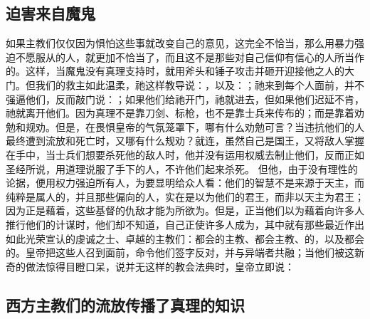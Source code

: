 
\subsection{迫害来自魔鬼}

如果主教们仅仅因为惧怕这些事就改变自己的意见，这完全不恰当，那么用暴力强迫不愿服从的人，就更加不恰当了，而且这不是那些对自己信仰有信心的人所当作的。这样，当魔鬼没有真理支持时，就用斧头和锤子攻击并砸开迎接他之人的大门。但我们的救主如此温柔，祂这样教导说：，以及：；祂来到每个人面前，并不强逼他们，反而敲门说：；如果他们给祂开门，祂就进去，但如果他们迟延不肯，祂就离开他们。因为真理不是靠刀剑、标枪，也不是靠士兵来传布的；而是靠着劝勉和规劝。但是，在畏惧皇帝的气氛笼罩下，哪有什么劝勉可言？当违抗他们的人最终遭到流放和死亡时，又哪有什么规劝？就连，虽然自己是国王，又将敌人掌握在手中，当士兵们想要杀死他的敌人时，他并没有运用权威去制止他们，反而正如圣经所说，用道理说服了手下的人，不许他们起来杀死。 但他，由于没有理性的论据，便用权力强迫所有人，为要显明给众人看：他们的智慧不是来源于天主，而纯粹是属人的，并且那些偏向的人，实在是以为他们的君王，而非以天主为君王；因为正是藉着，这些基督的仇敌才能为所欲为。但是，正当他们以为藉着向许多人推行他们的计谋时，他们却不知道，自己正使许多人成为，其中就有那些最近作出如此光荣宣认的虔诚之士、卓越的主教们：都会的主教、都会主教、的，以及都会的。皇帝把这些人召到面前，命令他们签字反对，并与异端者共融；当他们被这新奇的做法惊得目瞪口呆，说并无这样的教会法典时，皇帝立即说：\par


\subsection{西方主教们的流放传播了真理的知识}

